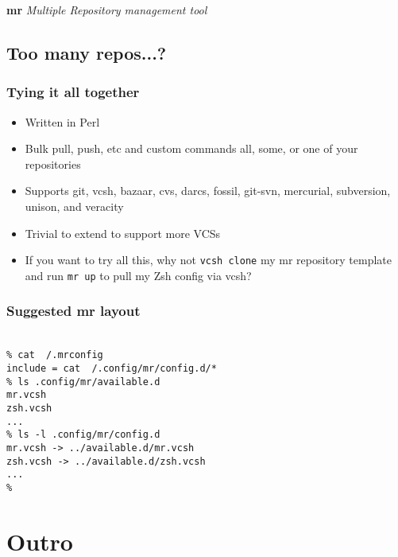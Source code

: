 \documentclass[t]{beamer}
\begin{document}
\begin{frame}
		\begin{center}
			\vfill
			\vfill
			\textbf{mr}
			\vfill
			\textit{Multiple Repository management tool}
			\vfill
			\vfill
		\end{center}
\end{frame}

\subsection{Too many repos...?}

\begin{frame}
	\frametitle{Tying it all together}
	\begin{itemize}
		\item Written in Perl
		\item Bulk pull, push, etc and custom commands all, some, or one of your repositories
		\item Supports git, vcsh, bazaar, cvs, darcs, fossil, git-svn, mercurial, subversion, unison, and veracity
		\item Trivial to extend to support more VCSs
		\item If you want to try all this, why not \texttt{vcsh clone} my mr repository template and run \texttt{mr up} to pull my Zsh config via vcsh?
	\end{itemize}
\end{frame}

\begin{frame}
	\frametitle{Suggested mr layout}
	\texttt{ \\
		\% cat ~/.mrconfig \\
		include = cat ~/.config/mr/config.d/* \\
		\% ls .config/mr/available.d \\
		mr.vcsh \\
		zsh.vcsh \\
		... \\
		\% ls -l .config/mr/config.d \\
		mr.vcsh -> ../available.d/mr.vcsh \\
		zsh.vcsh -> ../available.d/zsh.vcsh \\
		... \\
		\%
	}
\end{frame}


\section{Outro}
\end{document}
